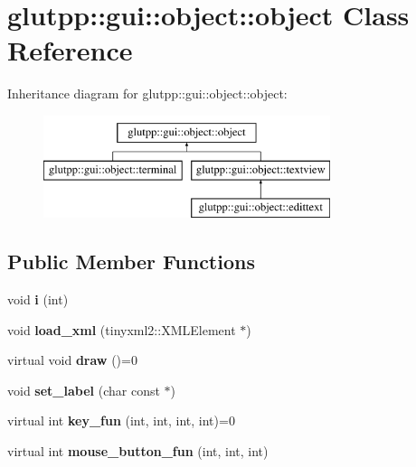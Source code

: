 \hypertarget{classglutpp_1_1gui_1_1object_1_1object}{\section{glutpp\-:\-:gui\-:\-:object\-:\-:object \-Class \-Reference}
\label{classglutpp_1_1gui_1_1object_1_1object}
}
\-Inheritance diagram for glutpp\-:\-:gui\-:\-:object\-:\-:object\-:\begin{figure}[H]
\begin{center}
\leavevmode
\includegraphics[height=3.000000cm]{classglutpp_1_1gui_1_1object_1_1object}
\end{center}
\end{figure}
\subsection*{\-Public \-Member \-Functions}
\begin{DoxyCompactItemize}
\item 
\hypertarget{classglutpp_1_1gui_1_1object_1_1object_a006afaeceb89f8feb38bdadee1de8ab6}{void {\bfseries i} (int)}\label{classglutpp_1_1gui_1_1object_1_1object_a006afaeceb89f8feb38bdadee1de8ab6}

\item 
\hypertarget{classglutpp_1_1gui_1_1object_1_1object_a0026a69fac8b8257817395806935a348}{void {\bfseries load\-\_\-xml} (tinyxml2\-::\-X\-M\-L\-Element $\ast$)}\label{classglutpp_1_1gui_1_1object_1_1object_a0026a69fac8b8257817395806935a348}

\item 
\hypertarget{classglutpp_1_1gui_1_1object_1_1object_aa444e18e9d861c9dc3303a7baefaff25}{virtual void {\bfseries draw} ()=0}\label{classglutpp_1_1gui_1_1object_1_1object_aa444e18e9d861c9dc3303a7baefaff25}

\item 
\hypertarget{classglutpp_1_1gui_1_1object_1_1object_ac9a25796fed624c224301a7de4601937}{void {\bfseries set\-\_\-label} (char const $\ast$)}\label{classglutpp_1_1gui_1_1object_1_1object_ac9a25796fed624c224301a7de4601937}

\item 
\hypertarget{classglutpp_1_1gui_1_1object_1_1object_a63569b7bbd67ffe91fa48ce08288c388}{virtual int {\bfseries key\-\_\-fun} (int, int, int, int)=0}\label{classglutpp_1_1gui_1_1object_1_1object_a63569b7bbd67ffe91fa48ce08288c388}

\item 
\hypertarget{classglutpp_1_1gui_1_1object_1_1object_a9fe2709890ef4285fbfebec5b117eb6f}{virtual int {\bfseries mouse\-\_\-button\-\_\-fun} (int, int, int)}\label{classglutpp_1_1gui_1_1object_1_1object_a9fe2709890ef4285fbfebec5b117eb6f}

\end{DoxyCompactItemize}
